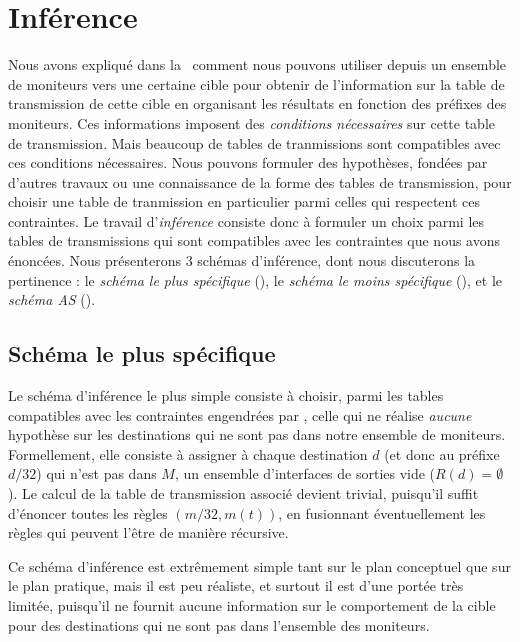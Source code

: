 \section{Inférence}
\label{sec:revtables-inference}

Nous avons expliqué dans la~ comment nous pouvons
utiliser \udpping depuis un ensemble de moniteurs vers une certaine cible pour
obtenir de l'information sur la table de transmission de cette cible en
organisant les résultats en fonction des préfixes des moniteurs. Ces
informations imposent des {\em conditions nécessaires} sur cette table de
transmission. Mais beaucoup de tables de tranmissions sont compatibles avec ces
conditions nécessaires. Nous pouvons formuler des hypothèses, fondées par
d'autres travaux ou une connaissance \apriori de la forme des tables de
transmission, pour choisir une table de tranmission en particulier parmi celles
qui respectent ces contraintes. Le travail d'{\em inférence} consiste donc à
formuler un choix parmi les tables de transmissions qui sont compatibles avec
les contraintes que nous avons énoncées. Nous présenterons 3 schémas
d'inférence, dont nous discuterons la pertinence : le {\em schéma le plus spécifique}
(), le {\em schéma le moins
spécifique} (), et le {\em schéma
AS} ().

\subsection{Schéma le plus spécifique}
\label{subsec:revtables-inference-most-specific}

Le schéma d'inférence le plus simple consiste à choisir, parmi les tables
compatibles avec les contraintes engendrées par \udpping, celle qui ne réalise
{\em aucune} hypothèse sur les destinations qui ne sont pas dans notre ensemble
de moniteurs. Formellement, elle consiste à assigner à chaque destination $d$
(et donc au préfixe $d/32$) qui n'est pas dans $M$, un ensemble d'interfaces de
sorties vide ($R(d) = \emptyset$). Le calcul de la table de transmission associé
devient trivial, puisqu'il suffit d'énoncer toutes les règles $(m/32, m(t))$,
en fusionnant éventuellement les règles qui peuvent l'être de manière récursive.

Ce schéma d'inférence est extrêmement simple tant sur le plan conceptuel que sur
le plan pratique, mais il est peu réaliste, et surtout il est d'une portée très
limitée, puisqu'il ne fournit aucune information sur le comportement de la cible
pour des destinations qui ne sont pas dans l'ensemble des moniteurs.

